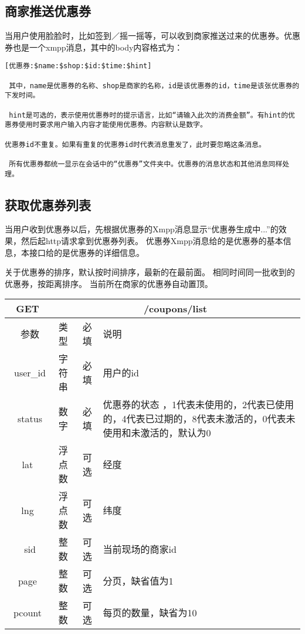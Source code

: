 \subsection{商家推送优惠券}
当用户使用脸脸时，比如签到／摇一摇等，可以收到商家推送过来的优惠券。优惠券也是一个xmpp消息，其中的body内容格式为：

\begin{verbatim}
[优惠券:$name:$shop:$id:$time:$hint]

 其中，name是优惠券的名称、shop是商家的名称，id是该优惠券的id，time是该张优惠券的下发时间。
 
 hint是可选的，表示使用优惠券时的提示语言，比如“请输入此次的消费金额”。有hint的优惠券使用时要求用户输入内容才能使用优惠券。内容默认是数字。
 
优惠券id不重复。如果有重复的优惠券id时代表消息重发了，此时要忽略这条消息。
 
 所有优惠券都统一显示在会话中的“优惠券”文件夹中。优惠券的消息状态和其他消息同样处理。
\end{verbatim}


\subsection{获取优惠券列表}
当用户收到优惠券以后，先根据优惠券的Xmpp消息显示“优惠券生成中...”的效果，然后起http请求拿到优惠券列表。
优惠券Xmpp消息给的是优惠券的基本信息，本接口给的是优惠券的详细信息。

关于优惠券的排序，默认按时间排序，最新的在最前面。
相同时间同一批收到的优惠券，按距离排序。
当前所在商家的优惠券自动置顶。

\begin{table}[H]
   \begin{center}
\begin{tabular}{|c|c|c|p{12cm}|}
\hline
GET & \multicolumn{3}{|c|}{/coupons/list} \\
\hline\hline
 \  参数  & 类型 & 必填 &  说明  \\
\hline
 \  user\_id  & 字符串 & 必填 &  用户的id  \\
\hline
 \  status  & 数字 & 必填 &  优惠券的状态 ，1代表未使用的，2代表已使用的，4代表已过期的，8代表未激活的，0代表未使用和未激活的，默认为0\\
\hline
 lat  & 浮点数 & 可选 & 经度\\
\hline
 lng  &  浮点数 & 可选 & 纬度\\ 
 \hline
 \ sid  &  整数 & 可选 & 当前现场的商家id\\ 
  \hline
 page  & 整数 & 可选 & 分页，缺省值为1\\ 
 \hline
 pcount  & 整数 & 可选 & 每页的数量，缺省为10\\ 
\hline
\end{tabular}
   \end{center}
\end{table}


